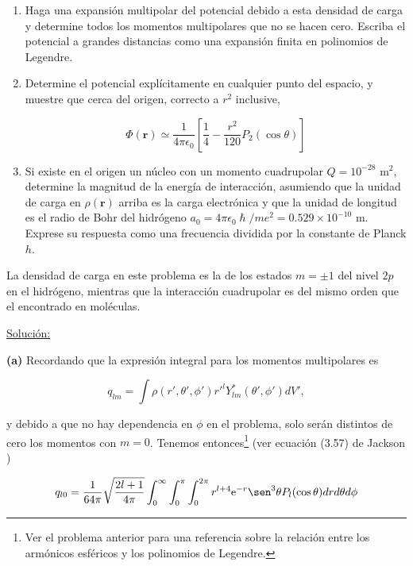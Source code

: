 \documentclass[a4paper,11pt]{article}
\numberwithin{equation}{section}
\newcommand{\euler}{\mathrm{e}}
\begin{document}
\begin{enumerate}[label=\textbf{(\alph*)}]
\item Haga una expansión multipolar del potencial debido a esta densidad de 
carga y determine todos los momentos multipolares que no se hacen cero. Escriba 
el potencial a grandes distancias como una expansión finita en polinomios de 
Legendre. 
\item Determine el potencial explícitamente en cualquier punto del espacio, y 
muestre que cerca del origen, correcto a $r^2$ inclusive,

$$
\Phi(\mathbf{r}) \simeq \frac{1}{4\pi\epsilon_0}\left[\frac{1}{4} 
 - \frac{r^2}{120}P_2(\cos{\theta})\right]
$$

\item Si existe en el origen un núcleo con un momento cuadrupolar $Q = 10^{-28}$ m$^2$, 
determine la magnitud de la energía de interacción, asumiendo que la unidad de 
carga en $\rho(\mathbf{r})$ arriba es la carga electrónica y que la unidad de 
longitud es el radio de Bohr del hidrógeno $a_0 = 4\pi\epsilon_0\hslash/me^2 = 
0.529 \times 10^{-10}$ m. Exprese su respuesta como una frecuencia dividida por 
la constante de Planck $h$.
\end{enumerate}

La densidad de carga en este problema es la de los estados $m = \pm 1$ del nivel 
$2p$ en el hidrógeno, mientras que la interacción cuadrupolar es del mismo orden 
que el encontrado en moléculas.

\vspace{.3cm}

\underline{Solución:} \vspace{.3cm}

\textbf{(a)} Recordando que la expresión integral para los momentos multipolares es 

\begin{equation}
 q_{lm} = \int \rho(r',\theta',\phi')r'^l Y^*_{lm}(\theta',\phi')dV',
\end{equation}

y debido a que no hay dependencia en $\phi$ en el problema, solo serán distintos de 
cero los momentos con $m=0$. Tenemos entonces\footnote{Ver el problema anterior 
para una referencia sobre la relación entre los armónicos esféricos y los polinomios 
de Legendre.} (ver ecuación (3.57) de Jackson \cite{jackson})

\begin{equation}
 q_{l0} = \frac{1}{64\pi}\sqrt{\frac{2l+1}{4\pi}}\int_0^\infty \int_0^\pi \int_0^{2\pi} 
 r^{l+4}\euler^{-r}\sen^3{\theta}P_l(\cos{\theta})drd\theta d\phi
\end{equation}
\end{document}
